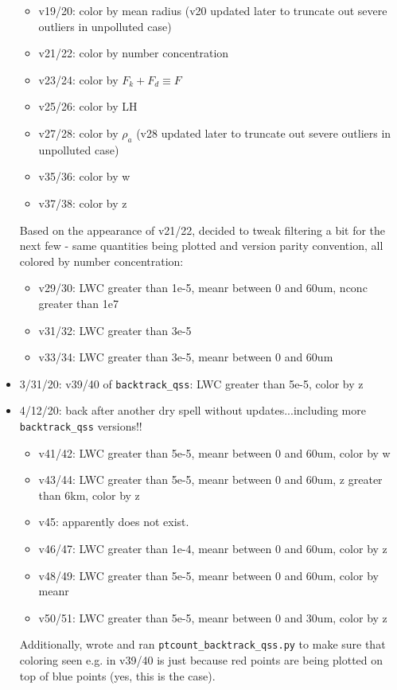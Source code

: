 \documentclass{article}
\begin{document}
\begin{itemize}
	\begin{itemize}
		\item v19/20: color by mean radius (v20 updated later to truncate out severe outliers in unpolluted case)
		\item v21/22: color by number concentration
		\item v23/24: color by $F_k + F_d\equiv F$
		\item v25/26: color by LH
		\item v27/28: color by $\rho_a$ (v28 updated later to truncate out severe outliers in unpolluted case)
		\item v35/36: color by w
		\item v37/38: color by z
	\end{itemize}
\indent Based on the appearance of v21/22, decided to tweak filtering a bit for the next few - same quantities being plotted and version parity convention, all colored by number concentration:
	\begin{itemize}
		\item v29/30: LWC greater than 1e-5, meanr between 0 and 60um, nconc greater than 1e7
		\item v31/32: LWC greater than 3e-5
		\item v33/34: LWC greater than 3e-5, meanr between 0 and 60um
	\end{itemize}
	\item 3/31/20: v39/40 of \texttt{backtrack\_qss}: LWC greater than 5e-5, color by z
	\item 4/12/20: back after another dry spell without updates...including more \texttt{backtrack\_qss} versions!!
	\begin{itemize}
		\item v41/42: LWC greater than 5e-5, meanr between 0 and 60um, color by w
		\item v43/44: LWC greater than 5e-5, meanr between 0 and 60um, z greater than 6km, color by z
		\item v45: apparently does not exist.
		\item v46/47: LWC greater than 1e-4, meanr between 0 and 60um, color by z
		\item v48/49: LWC greater than 5e-5, meanr between 0 and 60um, color by meanr 
		\item v50/51: LWC greater than 5e-5, meanr between 0 and 30um, color by z
	\end{itemize}
	\indent Additionally, wrote and ran \texttt{ptcount\_backtrack\_qss.py} to make sure that coloring seen e.g. in v39/40 is just because red points are being plotted on top of blue points (yes, this is the case).\\


\end{itemize}
\end{document}
